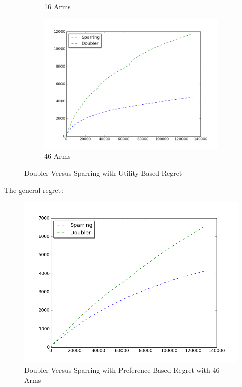 \documentclass{llncs}
\begin{document}
\begin{figure}[h!]
\begin{subfigure}{.5\textwidth}
  \caption{16 Arms}
  \label{fig:sub2}
\end{subfigure}
\begin{subfigure}{.5\textwidth}
  \centering
  \includegraphics[scale=0.3]{figures/doubler_sparring_MQ2007_46arms.png}
  \caption{46 Arms}
  \label{fig:sub2}
\end{subfigure}
\caption{Doubler Versus Sparring with Utility Based Regret}
\label{fig:test}
\end{figure}

The general regret:
\begin{figure}[h!]
  \centering
     \includegraphics[scale=0.2]{figures/doubler_sparring_MQ2007_general.png} 
  \caption{Doubler Versus Sparring with Preference Based Regret with 46 Arms}
\end{figure}
\end{document}
